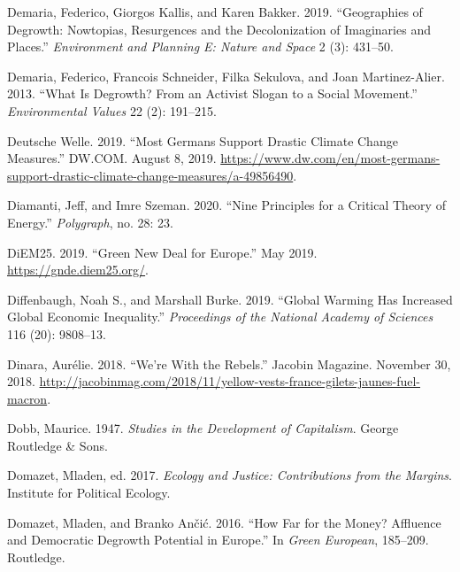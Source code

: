 \documentclass[a4paper, nobind]{templates/ociamthesis}
\newlength{\cslhangindent}
\newenvironment{CSLReferences}[2] %
 {%
  \setlength{\parindent}{0pt}
  \ifodd #1
  \let\oldpar\par
  \def\par{\hangindent=\cslhangindent\oldpar}
  \fi
  \setlength{\parskip}{1mm}
  \setlength{\baselineskip}{6mm}
 }%
 {}
\begin{document}
\begin{CSLReferences}{1}{0}
\leavevmode{}%
Demaria, Federico, Giorgos Kallis, and Karen Bakker. 2019. {``Geographies of Degrowth: {Nowtopias}, Resurgences and the Decolonization of Imaginaries and Places.''} \emph{Environment and Planning E: Nature and Space} 2 (3): 431--50.

\leavevmode{}%
Demaria, Federico, Francois Schneider, Filka Sekulova, and Joan Martinez-Alier. 2013. {``What Is Degrowth? {From} an Activist Slogan to a Social Movement.''} \emph{Environmental Values} 22 (2): 191--215.

\leavevmode{}%
Deutsche Welle. 2019. {``Most {Germans} Support Drastic Climate Change Measures.''} {DW.COM}. August 8, 2019. \url{https://www.dw.com/en/most-germans-support-drastic-climate-change-measures/a-49856490}.

\leavevmode{}%
Diamanti, Jeff, and Imre Szeman. 2020. {``Nine {Principles} for a {Critical Theory} of {Energy}.''} \emph{Polygraph}, no. 28: 23.

\leavevmode{}%
DiEM25. 2019. {``Green {New Deal} for {Europe}.''} May 2019. \url{https://gnde.diem25.org/}.

\leavevmode{}%
Diffenbaugh, Noah S., and Marshall Burke. 2019. {``Global Warming Has Increased Global Economic Inequality.''} \emph{Proceedings of the National Academy of Sciences} 116 (20): 9808--13.

\leavevmode{}%
Dinara, Aurélie. 2018. {``We're {With} the {Rebels}.''} {Jacobin Magazine}. November 30, 2018. \url{http://jacobinmag.com/2018/11/yellow-vests-france-gilets-jaunes-fuel-macron}.

\leavevmode{}%
Dobb, Maurice. 1947. \emph{Studies in the {Development} of {Capitalism}}. {George Routledge \& Sons}.

\leavevmode{}%
Domazet, Mladen, ed. 2017. \emph{Ecology and {Justice}: {Contributions} from the {Margins}}. {Institute for Political Ecology}.

\leavevmode{}%
Domazet, Mladen, and Branko Ančić. 2016. {``How Far for the Money? {Affluence} and Democratic Degrowth Potential in {Europe}.''} In \emph{Green {European}}, 185--209. {Routledge}.


\end{CSLReferences}
\end{document}
